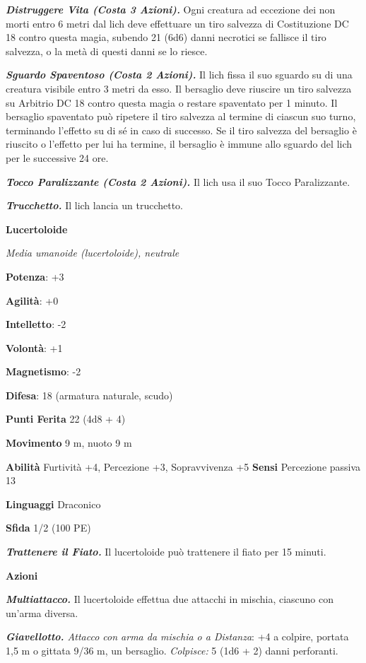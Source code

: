 \begin{multicols}{2}
\emph{\textbf{Distruggere Vita (Costa 3 Azioni).}} Ogni creatura ad
eccezione dei non morti entro 6 metri dal lich deve effettuare un tiro
salvezza di Costituzione DC 18 contro questa magia, subendo 21 (6d6)
danni necrotici se fallisce il tiro salvezza, o la metà di questi danni
se lo riesce.

\emph{\textbf{Sguardo Spaventoso (Costa 2 Azioni).}} Il lich fissa il
suo sguardo su di una creatura visibile entro 3 metri da esso. Il
bersaglio deve riuscire un tiro salvezza su Arbitrio DC 18 contro questa
magia o restare spaventato per 1 minuto. Il bersaglio spaventato può
ripetere il tiro salvezza al termine di ciascun suo turno, terminando
l'effetto su di sé in caso di successo. Se il tiro salvezza del
bersaglio è riuscito o l'effetto per lui ha termine, il bersaglio è
immune allo sguardo del lich per le successive 24 ore.

\emph{\textbf{Tocco Paralizzante (Costa 2 Azioni).}} Il lich usa il suo
Tocco Paralizzante.

\emph{\textbf{Trucchetto.}} Il lich lancia un trucchetto.

\textbf{Lucertoloide}

\emph{Media umanoide (lucertoloide), neutrale}

\textbf{Potenza}: +3

\textbf{Agilità}: +0

\textbf{Intelletto}: -2

\textbf{Volontà}: +1

\textbf{Magnetismo}: -2

\textbf{Difesa}: 18 (armatura naturale, scudo)

\textbf{Punti Ferita} 22 (4d8 + 4)

\textbf{Movimento} 9 m, nuoto 9 m

\textbf{Abilità} Furtività +4, Percezione +3, Sopravvivenza +5
\textbf{Sensi} Percezione passiva 13

\textbf{Linguaggi} Draconico

\textbf{Sfida} 1/2 (100 PE)

\emph{\textbf{Trattenere il Fiato.}} Il lucertoloide può trattenere il
fiato per 15 minuti.

\textbf{Azioni}

\emph{\textbf{Multiattacco.}} Il lucertoloide effettua due attacchi in
mischia, ciascuno con un'arma diversa.

\emph{\textbf{Giavellotto.} Attacco con arma da mischia o a Distanza}:
+4 a colpire, portata 1,5 m o gittata 9/36 m, un bersaglio.
\emph{Colpisce:} 5 (1d6 + 2) danni perforanti.


\end{multicols}
